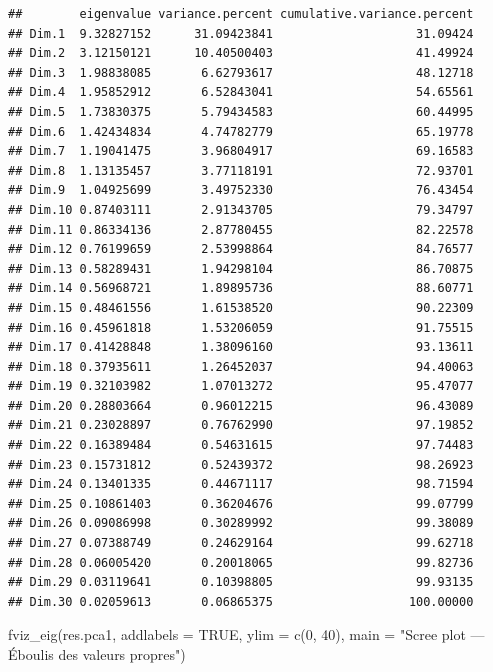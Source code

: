 \documentclass[
]{article}
\newenvironment{Shaded}{\begin{snugshade}}{\end{snugshade}}
\newcommand{\AttributeTok}[1]{\textcolor[rgb]{0.77,0.63,0.00}{#1}}
\newcommand{\ConstantTok}[1]{\textcolor[rgb]{0.00,0.00,0.00}{#1}}
\newcommand{\DecValTok}[1]{\textcolor[rgb]{0.00,0.00,0.81}{#1}}
\newcommand{\FunctionTok}[1]{\textcolor[rgb]{0.00,0.00,0.00}{#1}}
\newcommand{\NormalTok}[1]{#1}
\newcommand{\StringTok}[1]{\textcolor[rgb]{0.31,0.60,0.02}{#1}}
\begin{document}
\begin{verbatim}
##        eigenvalue variance.percent cumulative.variance.percent
## Dim.1  9.32827152      31.09423841                    31.09424
## Dim.2  3.12150121      10.40500403                    41.49924
## Dim.3  1.98838085       6.62793617                    48.12718
## Dim.4  1.95852912       6.52843041                    54.65561
## Dim.5  1.73830375       5.79434583                    60.44995
## Dim.6  1.42434834       4.74782779                    65.19778
## Dim.7  1.19041475       3.96804917                    69.16583
## Dim.8  1.13135457       3.77118191                    72.93701
## Dim.9  1.04925699       3.49752330                    76.43454
## Dim.10 0.87403111       2.91343705                    79.34797
## Dim.11 0.86334136       2.87780455                    82.22578
## Dim.12 0.76199659       2.53998864                    84.76577
## Dim.13 0.58289431       1.94298104                    86.70875
## Dim.14 0.56968721       1.89895736                    88.60771
## Dim.15 0.48461556       1.61538520                    90.22309
## Dim.16 0.45961818       1.53206059                    91.75515
## Dim.17 0.41428848       1.38096160                    93.13611
## Dim.18 0.37935611       1.26452037                    94.40063
## Dim.19 0.32103982       1.07013272                    95.47077
## Dim.20 0.28803664       0.96012215                    96.43089
## Dim.21 0.23028897       0.76762990                    97.19852
## Dim.22 0.16389484       0.54631615                    97.74483
## Dim.23 0.15731812       0.52439372                    98.26923
## Dim.24 0.13401335       0.44671117                    98.71594
## Dim.25 0.10861403       0.36204676                    99.07799
## Dim.26 0.09086998       0.30289992                    99.38089
## Dim.27 0.07388749       0.24629164                    99.62718
## Dim.28 0.06005420       0.20018065                    99.82736
## Dim.29 0.03119641       0.10398805                    99.93135
## Dim.30 0.02059613       0.06865375                   100.00000
\end{verbatim}

\begin{Shaded}
\begin{Highlighting}[]
\FunctionTok{fviz\_eig}\NormalTok{(res.pca1, }\AttributeTok{addlabels =} \ConstantTok{TRUE}\NormalTok{, }\AttributeTok{ylim =} \FunctionTok{c}\NormalTok{(}\DecValTok{0}\NormalTok{, }\DecValTok{40}\NormalTok{),}
         \AttributeTok{main =} \StringTok{"Scree plot — Éboulis des valeurs propres"}\NormalTok{)}
\end{Highlighting}
\end{Shaded}
\end{document}
